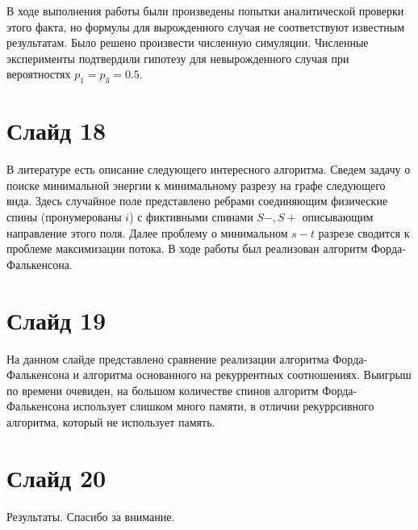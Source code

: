\documentclass[a4paper]{article}
\begin{document}
В ходе выполнения работы были произведены попытки аналитической проверки этого факта, но формулы для вырожденного случая не соответствуют известным результатам. Было решено произвести численную симуляции. Численные эксперименты подтвердили гипотезу для невырожденного случая при вероятностях $p_1 = p_3 = 0.5$.

\section*{Слайд 18}
В литературе есть описание следующего интересного алгоритма. Сведем задачу о поиске минимальной энергии к минимальному разрезу на графе следующего вида. Здесь случайное поле представлено ребрами соединяющим физические спины (пронумерованы $i$) с фиктивными спинами $S-, S+$ описывающим направление этого поля. 
Далее проблему о минимальном $s-t$ разрезе сводится к проблеме максимизации потока. В ходе работы был реализован алгоритм Форда-Фалькенсона.
\section*{Слайд 19}
На данном слайде представлено сравнение реализации алгоритма Форда-Фалькенсона и алгоритма основанного на рекуррентных соотношениях. Выигрыш по времени очевиден, на большом количестве спинов алгоритм Форда-Фалькенсона использует слишком много памяти, в отличии рекуррсивного алгоритма, который не использует память.

\section*{Слайд 20}
Результаты. Спасибо за внимание.
\end{document}
